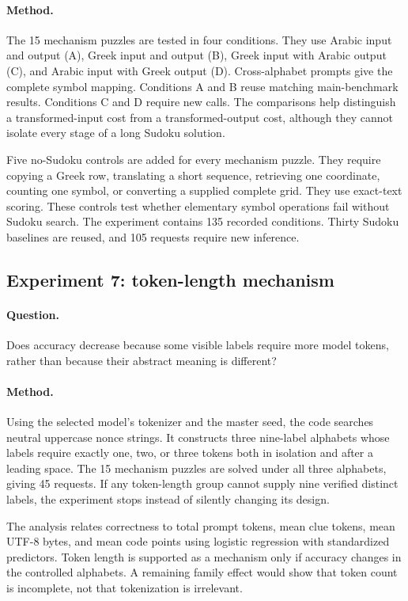 \documentclass[11pt,a4paper]{article}
\begin{document}
\paragraph{Method.}
The 15 mechanism puzzles are tested in four conditions. They use Arabic input and output (A), Greek input and output (B), Greek input with Arabic output (C), and Arabic input with Greek output (D). Cross-alphabet prompts give the complete symbol mapping. Conditions A and B reuse matching main-benchmark results. Conditions C and D require new calls. The comparisons help distinguish a transformed-input cost from a transformed-output cost, although they cannot isolate every stage of a long Sudoku solution.

Five no-Sudoku controls are added for every mechanism puzzle. They require copying a Greek row, translating a short sequence, retrieving one coordinate, counting one symbol, or converting a supplied complete grid. They use exact-text scoring. These controls test whether elementary symbol operations fail without Sudoku search. The experiment contains 135 recorded conditions. Thirty Sudoku baselines are reused, and 105 requests require new inference.

\subsection{Experiment 7: token-length mechanism}
\paragraph{Question.}
Does accuracy decrease because some visible labels require more model tokens, rather than because their abstract meaning is different?

\paragraph{Method.}
Using the selected model's tokenizer and the master seed, the code searches neutral uppercase nonce strings.  It constructs three nine-label alphabets whose labels require exactly one, two, or three tokens both in isolation and after a leading space.  The 15 mechanism puzzles are solved under all three alphabets, giving 45 requests.  If any token-length group cannot supply nine verified distinct labels, the experiment stops instead of silently changing its design.

The analysis relates correctness to total prompt tokens, mean clue tokens, mean UTF-8 bytes, and mean code points using logistic regression with standardized predictors.  Token length is supported as a mechanism only if accuracy changes in the controlled alphabets.  A remaining family effect would show that token count is incomplete, not that tokenization is irrelevant.
\end{document}

